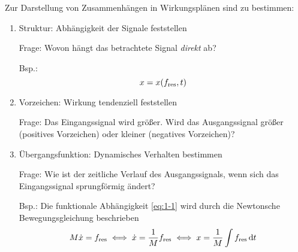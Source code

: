 \documentclass{exercise}
\begin{document}
	Zur Darstellung von Zusammenhängen in Wirkungsplänen sind zu bestimmen:
	\begin{enumerate}[label=\arabic*.]
		\item Struktur: Abhängigkeit der Signale feststellen

		Frage: Wovon hängt das betrachtete Signal \emph{direkt} ab?

		Bsp.:
		\begin{equation}\label{eq:1-1}
			x = x\parentheses*{f_{\text{res}}, t}
		\end{equation}
		\item Vorzeichen: Wirkung tendenziell feststellen

		Frage: Das Eingangssignal wird größer.
		Wird das Ausgangssignal größer (positives Vorzeichen) oder kleiner (negatives Vorzeichen)?
		\item Übergangsfunktion: Dynamisches Verhalten bestimmen

		Frage: Wie ist der zeitliche Verlauf des Ausgangssignals, wenn sich das Eingangssignal sprungförmig ändert?

		Bsp.: Die funktionale Abhängigkeit \ref{eq:1-1} wird durch die Newtonsche Bewegungsgleichung beschrieben
		\[
			M\dot{x} = f_{\text{res}} \iff \dot{x} = \frac{1}{M}f_{\text{res}} \iff x = \frac{1}{M}\int f_{\text{res}}\mathop{\mathrm{d}\!} t
		\]
	\end{enumerate}
	\begin{center}
	\end{center}
\end{document}
